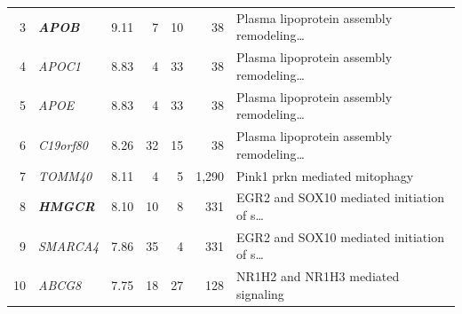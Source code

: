 \begin{table}[!t]
\begin{tabular}{rlrrrrl}
3 & \textbf{\textit{APOB}} & 9.11 & 7 & 10 & 38 & Plasma lipoprotein assembly remodeling\ldots \\
4 & \textit{APOC1} & 8.83 & 4 & 33 & 38 & Plasma lipoprotein assembly remodeling\ldots \\
5 & \textit{APOE} & 8.83 & 4 & 33 & 38 & Plasma lipoprotein assembly remodeling\ldots \\
6 & \textit{C19orf80} & 8.26 & 32 & 15 & 38 & Plasma lipoprotein assembly remodeling\ldots \\
7 & \textit{TOMM40} & 8.11 & 4 & 5 & 1{,}290 & Pink1 prkn mediated mitophagy \\
8 & \textbf{\textit{HMGCR}} & 8.10 & 10 & 8 & 331 & EGR2 and SOX10 mediated initiation of s\ldots \\
9 & \textit{SMARCA4} & 7.86 & 35 & 4 & 331 & EGR2 and SOX10 mediated initiation of s\ldots \\
10 & \textit{ABCG8} & 7.75 & 18 & 27 & 128 & NR1H2 and NR1H3 mediated signaling \\
\hline
\end{tabular}
\end{table}
